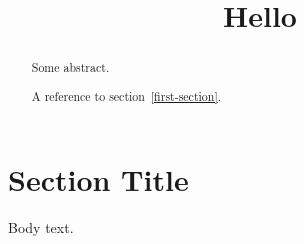 \documentclass{article}
\begin{document}
  \title{Hello}
  \maketitle
  \begin{abstract}
    Some abstract.

    A reference to section~\ref{first-section}.
  \end{abstract}

  \section{Section Title} \label{first-section}

  Body text.
\end{document}
